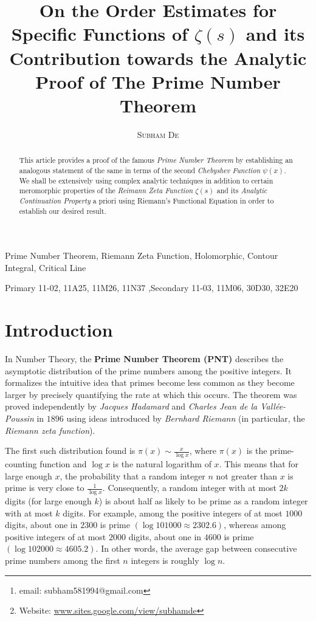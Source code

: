 \documentclass[article,12pt]{elsarticle}
\begin{document}
		
		\begin{frontmatter}
			
			\title{\bf On the Order Estimates for Specific Functions of $\zeta(s)$ and its Contribution towards the Analytic Proof of The Prime Number Theorem}
			
			\author[affil]{\textsc{Subham De} }
			
			\address[affil]{Department of Mathematics, Indian Institute of Technology Delhi, India \footnote{email: subham581994@gmail.com}\footnote{Website: \url{www.sites.google.com/view/subhamde}}}
			
			\begin{abstract}
				\noindent This article provides a proof of the famous \textit{Prime Number Theorem} by establishing an analogous statement of the same in terms of the second \textit{Chebyshev Function} $\psi(x)$. We shall be extensively using complex analytic techniques in addition to certain meromorphic properties of the \textit{Reimann Zeta Function} $\zeta(s)$ and its \textit{Analytic Continuation Property} a priori using Riemann's Functional Equation in order to establish our desired result.
			\end{abstract}
			
			\begin{keyword}
				Prime Number Theorem, Riemann Zeta Function, Holomorphic, Contour Integral, Critical Line
				
				\MSC[2020] Primary  11-02, 11A25, 11M26, 11N37 \sep Secondary 11-03, 11M06, 30D30, 32E20
			\end{keyword}
			
			
		\end{frontmatter}
		
	\section{Introduction}	
	In Number Theory, the \textbf{Prime Number Theorem (PNT)} describes the asymptotic distribution of the prime numbers among the positive integers. It formalizes the intuitive idea that primes become less common as they become larger by precisely quantifying the rate at which this occurs. The theorem was proved independently by \textit{Jacques Hadamard} and \textit{Charles Jean de la Vallée-Poussin} in $1896$ using ideas introduced by \textit{Bernhard Riemann} (in particular, the \textit{Riemann zeta function}).\par
	The first such distribution found is $\pi(x)\sim \frac{x}{\log x}$, where $\pi(x)$ is the prime-counting function and $\log x$ is the natural logarithm of $x$. This means that for large enough $x$, the probability that a random integer $n$ not greater than $x$ is prime is very close to $\frac{1}{\log x}$. Consequently, a random integer with at most $2k$ digits (for large enough $k$) is about half as likely to be prime as a random integer with at most $k$ digits. For example, among the positive integers of at most $1000$ digits, about one in $2300$ is prime $(\log 101000\approx 2302.6)$, whereas among positive integers of at most $2000$ digits, about one in $4600$ is prime $(\log 102000 \approx 4605.2)$. In other words, the average gap between consecutive prime numbers among the first $n$ integers is roughly $\log n $.
\end{document}
